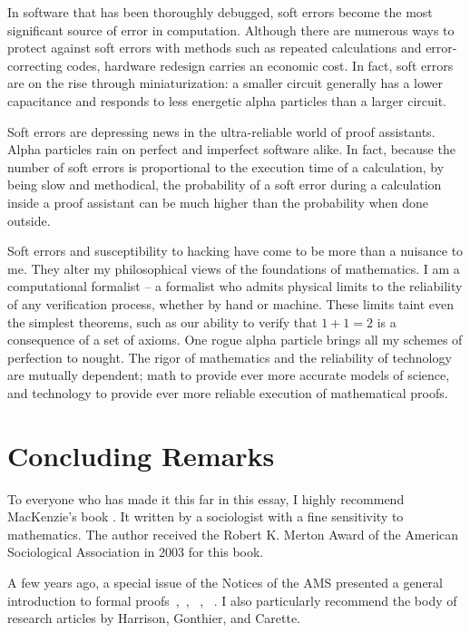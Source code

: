 \documentclass{llncs}
\begin{document}

In software that has been thoroughly debugged, soft errors become the
most significant source of error in computation.  Although there are
numerous ways to protect against soft errors with methods such as repeated calculations and error-correcting
codes, hardware redesign carries an economic cost.  In fact, soft errors are on
the rise through miniaturization: a smaller circuit generally has a lower
capacitance and responds to less energetic alpha particles than a larger
circuit.

Soft errors are depressing news in the ultra-reliable world of proof
assistants.  Alpha particles rain on perfect and imperfect software
alike.  In fact, because the number of soft errors is proportional to
the execution time of a calculation, by being slow and methodical, the
probability of a soft error during a calculation inside a proof
assistant can be much higher than the probability when done outside.


Soft errors and susceptibility to hacking have come to be more than a
nuisance to me.  They alter my philosophical views of the foundations
of mathematics.  I am a computational formalist -- a formalist who
admits physical limits to the reliability of any verification process,
whether by hand or machine.  These limits taint even the simplest
theorems, such as our ability to verify that $1+1=2$ is a consequence
of a set of axioms.  One rogue alpha particle brings all my schemes of
perfection to nought.  The rigor of mathematics and the reliability of
technology are mutually dependent; math to provide ever more accurate
models of science, and technology to provide ever more reliable
execution of mathematical proofs.

\newpage
\section{Concluding Remarks}


To everyone who has made it this far in this essay, I highly recommend
MacKenzie's book \cite{Mac}.  It written by a sociologist with a fine
sensitivity to mathematics.  The author received the Robert K. Merton
Award of the American Sociological Association in 2003 for this book.

  A few years ago, a special issue of the Notices of the
AMS presented a general introduction to formal
proofs~\cite{Hales:2008:formal},~\cite{Harrison:2008:formal},
~\cite{gonthier:2008:formal}, ~\cite{Wiedijk:2008:formal}.  I also
particularly recommend the body of research articles by Harrison,
Gonthier, and Carette.
\end{document}
